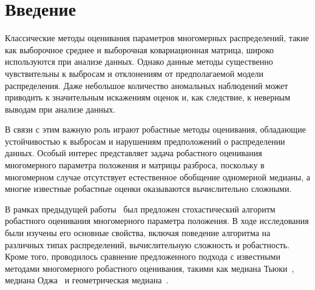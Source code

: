 

\chapter{Введение}

Классические методы оценивания параметров многомерных распределений, такие как выборочное среднее и выборочная ковариационная матрица, широко используются при анализе данных. Однако данные методы существенно чувствительны к выбросам и отклонениям от предполагаемой модели распределения. Даже небольшое количество аномальных наблюдений может приводить к значительным искажениям оценок и, как следствие, к неверным выводам при анализе данных.

В связи с этим важную роль играют робастные методы оценивания, обладающие устойчивостью к выбросам и нарушениям предположений о распределении данных. Особый интерес представляет задача робастного оценивания многомерного параметра положения и матрицы разброса, поскольку в многомерном случае отсутствует естественное обобщение одномерной медианы, а многие известные робастные оценки оказываются вычислительно сложными.

В рамках предыдущей работы~\cite{filatova2024robust} был предложен стохастический алгоритм робастного оценивания многомерного параметра положения. В ходе исследования были изучены его основные свойства, включая поведение алгоритма на различных типах распределений, вычислительную сложность и робастность. Кроме того, проводилось сравнение предложенного подхода с известными методами многомерного робастного оценивания, такими как медиана Тьюки~\cite{tukey1975mathematics}, медиана Оджа~\cite{oja1983descriptive} и геометрическая медиана~\cite{weber1929theory}.

